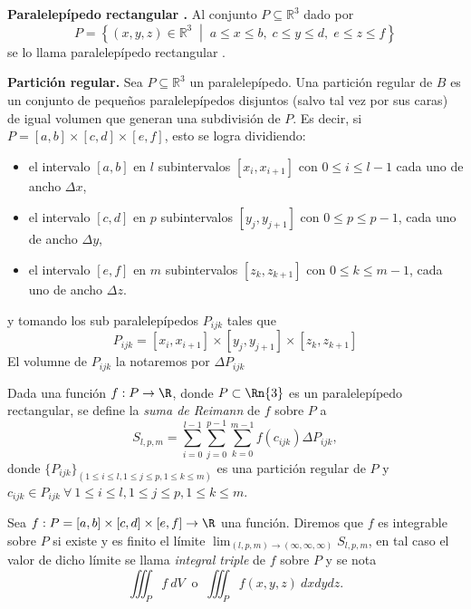 \begin{definition} \textbf{Paralelepípedo rectangular .}  Al conjunto $P  \subseteq  \mathbb{R}^3$ dado por
\[
P = \left\{ (x, y, z) \in \mathbb{R}^3 \;\middle|\; a \leq x \leq b,\; c \leq y \leq d,\; e \leq z \leq f \right\}
\] 
se lo llama paralelepípedo rectangular . 
\end{definition}


\begin{definition} \textbf{Partici\'on regular.} 	Sea \( P  \subseteq  \mathbb{R}^3 \) un paralelepípedo.  Una partición regular de $B$ es un conjunto de pequeños paralelepípedos disjuntos (salvo tal vez por sus caras)  de igual volumen que  generan una subdivisi\'on de $P$.  Es decir, si $P = [a, b] \times [c, d] \times [e, f]$,  esto se logra dividiendo:

\begin{itemize}
    \item el intervalo \( [a, b] \) en \( l \) subintervalos \( [x_i, x_{i+1}] \)  con $0 \leq  i \leq l-1$ cada uno de ancho \( \Delta x \),
    \item el intervalo \( [c, d] \) en \( p \) subintervalos \( [y_j, y_{j+1}] \)  con $0 \leq  p \leq p-1$, cada uno de ancho \( \Delta y \),
    \item el intervalo \( [e, f] \) en \( m \) subintervalos \( [z_k, z_{k+1}] \)  con $0 \leq  k \leq m-1$, cada uno de ancho \( \Delta z \).
\end{itemize}
y tomando los sub paralelepípedos $P_{ijk}$ tales que
	\[
	P_{ijk} = [x_i, x_{i+1}] \times [y_j, y_{j+1}] \times [z_k, z_{k+1}]
	\]  El volumne de $ P_{ijk}$ la notaremos por $\Delta P_{ijk}$ 
\end{definition}


%


\begin{definition}
Dada una funci\'on $f:P\to\R$, donde $P\subset \Rn{3}$ es un paralelep\'ipedo rectangular, se define la \emph{suma de Reimann}  de $f$ sobre $P$ a
\[
    S_{l,p,m}=\sum_{i=0}^{l-1}\sum_{j=0}^{p-1}\sum_{k=0}^{m-1}f(c_{ijk})\Delta P_{ijk},
\]  
donde $\{ P_{ijk}\}_{( 1 \leq i \leq l, 1 \leq j \leq p, 1 \leq k \leq m  )}$ es una partici\'on regular de $P$ y  $c_{ijk}\in P_{ijk}  \: \forall \: 1 \leq i \leq l, 1 \leq j \leq p, 1 \leq k \leq m.$ 
\end{definition}

\begin{definition} 
Sea $f: P=[a,b]\times[c,d]\times[e,f] \to\R$ una funci\'on.    Diremos que $f$ es integrable sobre $P$ si existe y es finito el  l\'imite $\lim_{(l,p,m)\to(\infty,\infty,\infty)} S_{l,p,m}$, en tal caso  el valor de dicho l\'imite  se llama \emph{integral triple} de $f$ sobre $P$ y se nota 
    \[
          \iiint_P f\:dV  \: \mbox{ o } \:  \iiint_P f(x,y,z)\:dxdydz.
    \]
\end{definition}







